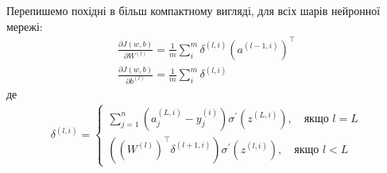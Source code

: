 \documentclass[14pt,a4paper]{extarticle}
\newcounter{e}
\numberwithin{equation}{section}
\numberwithin{figure}{section}
\newcommand{\ith}{^{(i)}}
\begin{document}
	Перепишемо похідні в більш компактному вигляді, для всіх шарів нейронної мережі:
	\begin{equation}
		\begin{array}{l}
			\displaystyle
			\frac{\partial J(w, b)}{\partial W^{(l)}} =\frac{1}{m} \sum_{i}^{m} 	\delta^{(l, i)}\left(a^{(l-1, i)}\right)^{\top}
			\\[0.7cm]
	
			\displaystyle
			 \frac{\partial J(w, b)}{\partial b^{(l)}} =\frac{1}{m} \sum_{i}^{m} \delta^{(l, i)}
		\end{array}
	\end{equation}
	де
	\begin{equation}
		\begin{array}{l}
		\displaystyle
			\delta^{(l, i)}
			=
			\left\{
			\begin{array}{l}
				\displaystyle
				\sum_{j=1}^{n}{ \left(a^{(L, i)}_j - y\ith_j\right)} \sigma^{\prime}(z^{(L, i)}), \quad \text{якщо } l = L
				\\[0.7cm]
				
				\displaystyle
				\left((W^{(l)})^{\top} \delta^{(l+1, i)} \right) \sigma^{\prime} (z^{(l, i)}), \quad \text{якщо } l < L
			\end{array}\right.
		\end{array}
	\end{equation}
\end{document}

